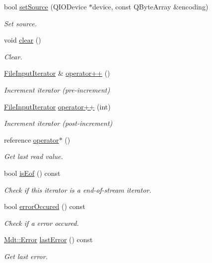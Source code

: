 \begin{DoxyCompactItemize}
bool \hyperlink{struct_mdt_1_1_plain_text_1_1_file_input_iterator_a5c8774871108780cc0c746a2b37163c5}{set\+Source} (Q\+I\+O\+Device $\ast$device, const Q\+Byte\+Array \&encoding)
\begin{DoxyCompactList}\small\item\em Set source. \end{DoxyCompactList}\item 
void \hyperlink{struct_mdt_1_1_plain_text_1_1_file_input_iterator_a4197ea452aa5e75602d1a38e08baef81}{clear} ()
\begin{DoxyCompactList}\small\item\em Clear. \end{DoxyCompactList}\item 
\hyperlink{struct_mdt_1_1_plain_text_1_1_file_input_iterator}{File\+Input\+Iterator} \& \hyperlink{struct_mdt_1_1_plain_text_1_1_file_input_iterator_a0048b29d504d922ab979c22063eae21a}{operator++} ()
\begin{DoxyCompactList}\small\item\em Increment iterator (pre-\/increment) \end{DoxyCompactList}\item 
\hyperlink{struct_mdt_1_1_plain_text_1_1_file_input_iterator}{File\+Input\+Iterator} \hyperlink{struct_mdt_1_1_plain_text_1_1_file_input_iterator_a28f4e511a266f8ffcd2a5844127050d7}{operator++} (int)
\begin{DoxyCompactList}\small\item\em Increment iterator (post-\/increment) \end{DoxyCompactList}\item 
reference \hyperlink{struct_mdt_1_1_plain_text_1_1_file_input_iterator_a5c3f8149a81d8f6f059fffe188f4110b}{operator$\ast$} ()
\begin{DoxyCompactList}\small\item\em Get last read value. \end{DoxyCompactList}\item 
bool \hyperlink{struct_mdt_1_1_plain_text_1_1_file_input_iterator_a5461a2af93730a77642d56333f952704}{is\+Eof} () const 
\begin{DoxyCompactList}\small\item\em Check if this iterator is a end-\/of-\/stream iterator. \end{DoxyCompactList}\item 
bool \hyperlink{struct_mdt_1_1_plain_text_1_1_file_input_iterator_afa93baaf36f16456fa29451fa4fcf9f3}{error\+Occured} () const 
\begin{DoxyCompactList}\small\item\em Check if a error occured. \end{DoxyCompactList}\item 
\hyperlink{class_mdt_1_1_error}{Mdt\+::\+Error} \hyperlink{struct_mdt_1_1_plain_text_1_1_file_input_iterator_a0d9ed2faf04b16e3a03fabd6a09db67e}{last\+Error} () const 
\begin{DoxyCompactList}\small\item\em Get last error. \end{DoxyCompactList}\end{DoxyCompactItemize}
